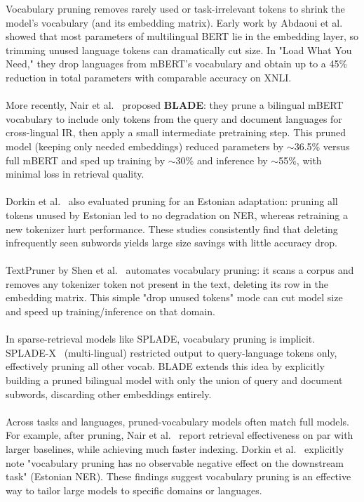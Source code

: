 \documentclass[twocolumn]{article}
\begin{document}
Vocabulary pruning removes rarely used or task-irrelevant tokens to shrink the model's vocabulary (and its embedding matrix). Early work by Abdaoui et al.~\cite{abdaoui2020load} showed that most parameters of multilingual BERT lie in the embedding layer, so trimming unused language tokens can dramatically cut size. In "Load What You Need," they drop languages from mBERT's vocabulary and obtain up to a 45\% reduction in total parameters with comparable accuracy on XNLI.
\\ \\
More recently, Nair et al.~\cite{nair2023blade} proposed \textbf{BLADE}: they prune a bilingual mBERT vocabulary to include only tokens from the query and document languages for cross-lingual IR, then apply a small intermediate pretraining step. This pruned model (keeping only needed embeddings) reduced parameters by $\sim$36.5\% versus full mBERT and sped up training by $\sim$30\% and inference by $\sim$55\%, with minimal loss in retrieval quality.
\\ \\
Dorkin et al.~\cite{dorkin2025estonian} also evaluated pruning for an Estonian adaptation: pruning all tokens unused by Estonian led to no degradation on NER, whereas retraining a new tokenizer hurt performance. These studies consistently find that deleting infrequently seen subwords yields large size savings with little accuracy drop.
\\ \\
TextPruner by Shen et al.~\cite{shen2022textpruner} automates vocabulary pruning: it scans a corpus and removes any tokenizer token not present in the text, deleting its row in the embedding matrix. This simple "drop unused tokens" mode can cut model size and speed up training/inference on that domain.
\\ \\
In sparse-retrieval models like SPLADE, vocabulary pruning is implicit. SPLADE-X~\cite{formal2023spladex} (multi-lingual) restricted output to query-language tokens only, effectively pruning all other vocab. BLADE extends this idea by explicitly building a pruned bilingual model with only the union of query and document subwords, discarding other embeddings entirely.
\\ \\
Across tasks and languages, pruned-vocabulary models often match full models. For example, after pruning, Nair et al.~\cite{nair2023blade} report retrieval effectiveness on par with larger baselines, while achieving much faster indexing. Dorkin et al.~\cite{dorkin2025estonian} explicitly note "vocabulary pruning has no observable negative effect on the downstream task" (Estonian NER). These findings suggest vocabulary pruning is an effective way to tailor large models to specific domains or languages.
\end{document}

